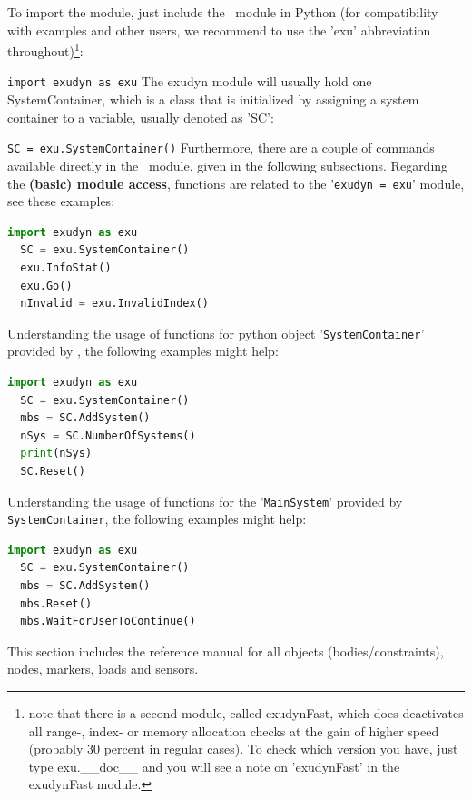 \documentclass[11pt,a4paper]{book} %
\begin{document}
To import the module, just include the \codeName\ module in Python (for compatibility with examples and other users, we recommend to use the 'exu' abbreviation throughout)\footnote{note that there is a second module, called exudynFast, which does deactivates all range-, index- or memory allocation checks at the gain of higher speed (probably 30 percent in regular cases). To check which version you have, just type exu.\_\_doc\_\_ and you will see a note on 'exudynFast' in the exudynFast module.}:
\bi
  \item[] \texttt{import exudyn as exu}
\ei
The exudyn module will usually hold one SystemContainer, which is a class that is initialized by assigning a system container to a variable, usually denoted as 'SC':
\bi
  \item[] \texttt{SC = exu.SystemContainer()}
\ei
Furthermore, there are a couple of commands available directly in the \codeName\ module, given in the following subsections.
Regarding the {\bf (basic) module access}, functions are related to the '\texttt{exudyn = exu}' module, see these examples:
\begin{lstlisting}[language=Python, firstnumber=14]
  import exudyn as exu
  SC = exu.SystemContainer()
  exu.InfoStat() 
  exu.Go()
  nInvalid = exu.InvalidIndex()
\end{lstlisting} \vspace{12pt}
%
Understanding the usage of functions for python object '\texttt{SystemContainer}' provided by \codeName, the following examples might help:
\begin{lstlisting}[language=Python, firstnumber=14]
  import exudyn as exu
  SC = exu.SystemContainer()
  mbs = SC.AddSystem()
  nSys = SC.NumberOfSystems()
  print(nSys)
  SC.Reset()
\end{lstlisting} \vspace{12pt}
%
Understanding the usage of functions for the '\texttt{MainSystem}' provided by \texttt{SystemContainer}, the following examples might help:
\begin{lstlisting}[language=Python, firstnumber=14]
  import exudyn as exu
  SC = exu.SystemContainer()
  mbs = SC.AddSystem()
  mbs.Reset()
  mbs.WaitForUserToContinue() 
\end{lstlisting} \vspace{12pt}
%




 \label{sec_item_reference_manual}
This section includes the reference manual for all objects (bodies/constraints), nodes, markers, loads and sensors.
\end{document}
